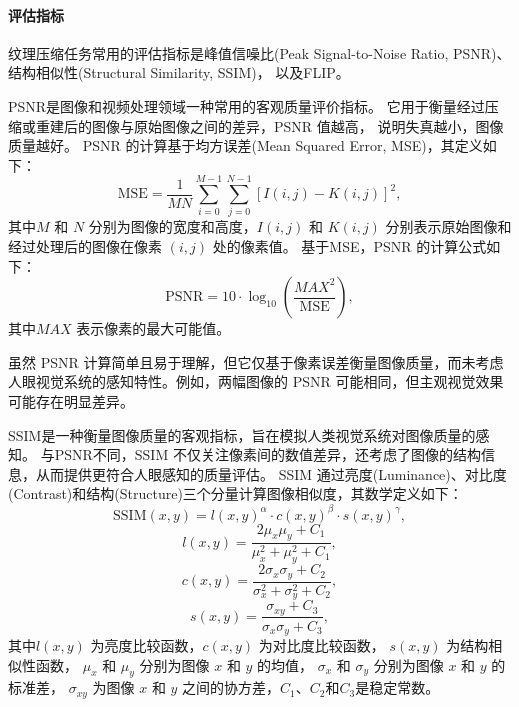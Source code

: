 \paragraph{评估指标}

纹理压缩任务常用的评估指标是峰值信噪比(Peak Signal-to-Noise Ratio, PSNR)、
结构相似性\cite{wang2004image}(Structural Similarity, SSIM)，
以及FLIP\cite{andersson2020flip}。

PSNR是图像和视频处理领域一种常用的客观质量评价指标。
它用于衡量经过压缩或重建后的图像与原始图像之间的差异，PSNR 值越高，
说明失真越小，图像质量越好。
PSNR 的计算基于均方误差(Mean Squared Error, MSE)，其定义如下：
\begin{equation}
\text{MSE} = \frac{1}{MN} \sum_{i=0}^{M-1} \sum_{j=0}^{N-1} \left[ I(i,j) - K(i,j) \right]^2,
\end{equation}
其中$M$ 和 $N$ 分别为图像的宽度和高度，$I(i,j)$ 和 $K(i,j)$ 分别表示原始图像和经过处理后的图像在像素 $(i,j)$ 处的像素值。
基于MSE，PSNR 的计算公式如下：
\begin{equation}
    \text{PSNR} = 10 \cdot \log_{10} \left( \frac{MAX^2}{\text{MSE}} \right),
\end{equation}
其中$MAX$ 表示像素的最大可能值。

虽然 PSNR 计算简单且易于理解，但它仅基于像素误差衡量图像质量，而未考虑人眼视觉系统的感知特性。例如，两幅图像的 PSNR 可能相同，但主观视觉效果可能存在明显差异。

SSIM\cite{wang2004image}是一种衡量图像质量的客观指标，旨在模拟人类视觉系统对图像质量的感知。
与PSNR不同，SSIM 不仅关注像素间的数值差异，还考虑了图像的结构信息，从而提供更符合人眼感知的质量评估。
SSIM 通过亮度(Luminance)、对比度(Contrast)和结构(Structure)三个分量计算图像相似度，其数学定义如下：
\begin{equation}
\text{SSIM}(x, y) = l(x, y)^\alpha \cdot c(x, y)^\beta \cdot s(x, y)^\gamma,
\end{equation}
\begin{equation}
l(x, y) = \frac{2\mu_x\mu_y + C_1}{\mu_x^2 + \mu_y^2 + C_1},
\end{equation}
\begin{equation}
c(x, y) = \frac{2\sigma_x\sigma_y + C_2}{\sigma_x^2 + \sigma_y^2 + C_2},
\end{equation}
\begin{equation}
s(x, y) = \frac{\sigma_{xy} + C_3}{\sigma_x \sigma_y + C_3},
\end{equation}
其中$l(x, y)$ 为亮度比较函数，$c(x, y)$ 为对比度比较函数，
$s(x, y)$ 为结构相似性函数，
$\mu_x$ 和 $\mu_y$ 分别为图像 $x$ 和 $y$ 的均值，
$\sigma_x$ 和 $\sigma_y$ 分别为图像 $x$ 和 $y$ 的标准差，
$\sigma_{xy}$ 为图像 $x$ 和 $y$ 之间的协方差，$C_1$、$C_2$和$C_3$是稳定常数。

